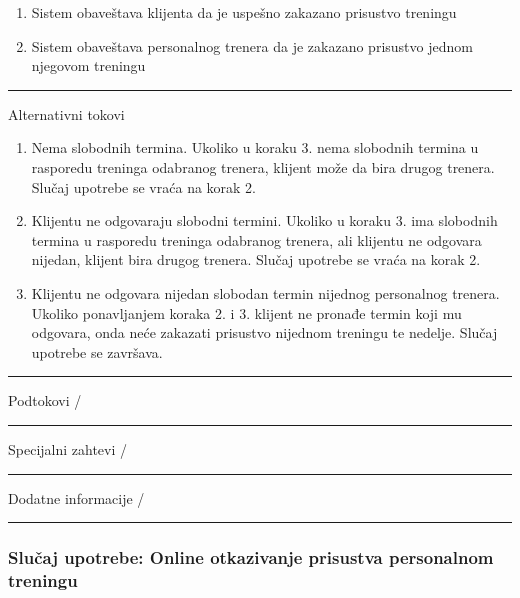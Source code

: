 \begin{center}
\begin{enumerate}
    \item Sistem obaveštava klijenta da je uspešno zakazano prisustvo treningu
    \item Sistem obaveštava personalnog trenera da je zakazano prisustvo jednom njegovom treningu
   \end{enumerate} 
\hrule
\vspace{0.2cm}
    Alternativni tokovi 
    \begin{enumerate}
    \item Nema slobodnih termina. Ukoliko u koraku 3. nema slobodnih termina u rasporedu treninga odabranog trenera, klijent može da bira drugog trenera. Slučaj upotrebe se vraća na korak 2.
    \item Klijentu ne odgovaraju slobodni termini. Ukoliko u koraku 3. ima slobodnih termina u rasporedu treninga odabranog trenera, ali klijentu ne odgovara nijedan, klijent bira drugog trenera. Slučaj upotrebe se vraća na korak 2.
    \item Klijentu ne odgovara nijedan slobodan termin nijednog personalnog trenera. Ukoliko ponavljanjem koraka 2. i 3. klijent ne pronađe termin koji mu odgovara, onda neće zakazati prisustvo nijednom treningu te nedelje. Slučaj upotrebe se završava.
   \end{enumerate} 
\hrule
\vspace{0.2cm}
    Podtokovi  /\\
\hrule
\vspace{0.2cm}
    Specijalni zahtevi  /\\
\hrule
\vspace{0.2cm}
    Dodatne informacije  /\\
\hrule
\vspace{0.5cm}
\end{center}



\subsubsection{Slučaj upotrebe: Online otkazivanje prisustva personalnom treningu}



